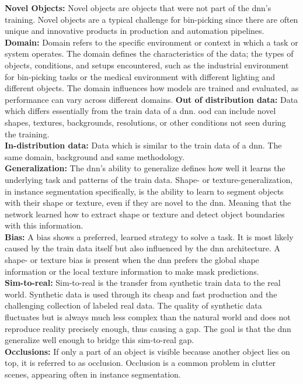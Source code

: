 		\textbf{Novel Objects:} Novel objects are objects that were not part of the \ac{dnn}'s training. Novel objects are a typical challenge for bin-picking since there are often unique and innovative products in production and automation pipelines.\\
		\textbf{Domain:} Domain refers to the specific environment or context in which a task or system operates. The domain defines the characteristics of the data; the types of objects, conditions, and setups encountered, such as the industrial environment for bin-picking tasks or the medical environment with different lighting and different objects. The domain influences how models are trained and evaluated, as performance can vary across different domains.
		\textbf{Out of distribution data:} Data which differs essentially from the train data of a \ac{dnn}. \acl{ood} can include novel shapes, textures, backgrounds, resolutions, or other conditions not seen during the training.\\
		\textbf{In-distribution data:} Data which is similar to the train data of a \ac{dnn}. The same domain, background and same methodology.\\
		\textbf{Generalization:} The \ac{dnn}'s ability to generalize defines how well it learns the underlying task and patterns of the train data. Shape- or texture-generalization, in instance segmentation specifically, is the ability to learn to segment objects with their shape or texture, even if they are novel to the \ac{dnn}. Meaning that the network learned how to extract shape or texture and detect object boundaries with this information. \\
		\textbf{Bias:} A bias shows a preferred, learned strategy to solve a task. It is most likely caused by the train data itself but also influenced by the \ac{dnn} architecture. A shape- or texture bias is present when the \ac{dnn} prefers the global shape information or the local texture information to make mask predictions.\\
		\textbf{Sim-to-real:} Sim-to-real is the transfer from synthetic train data to the real world. Synthetic data is used through its cheap and fast production and the challenging collection of labeled real data. The quality of synthetic data fluctuates but is always much less complex than the natural world and does not reproduce reality precisely enough, thus causing a gap. The goal is that the \ac{dnn} generalize well enough to bridge this sim-to-real gap.\\
		\textbf{Occlusions:} If only a part of an object is visible because another object lies on top, it is referred to as occlusion. Occlusion is a common problem in clutter scenes, appearing often in instance segmentation.
		
